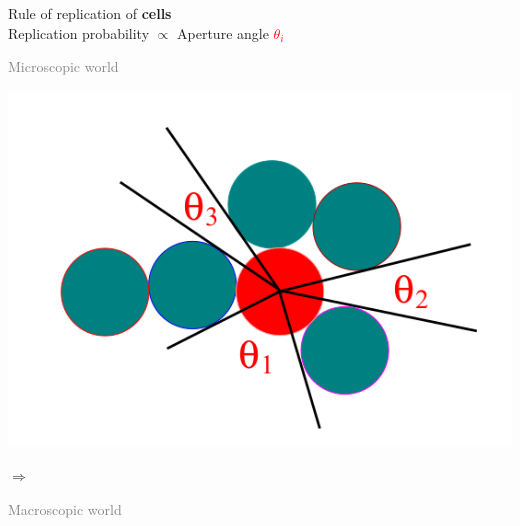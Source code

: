 \documentclass[9pt,table,xcolor=dvipsnames]{beamer}
\begin{document}
\begin{frame} %

  \begin{center}
    Rule of replication of \textcolor{cyan!50!black}{\bf cells}\\[1em]
    Replication probability $\propto$ Aperture angle \textcolor{red}{\bf $\theta_i$}
  \end{center}

  \bigskip
  \begin{center}
    \begin{minipage}{0.4\textwidth}
      \begin{center}
        \textcolor{gray}{\tiny Microscopic world}

        \includegraphics[scale=0.25]{figs/Eden-Mechanism.png}
        \bigskip

      \end{center}
    \end{minipage}
    \hfill
    {\Huge $\Rightarrow$}
    \hfill
    \begin{minipage}{0.4\textwidth}
      \begin{center}
        \textcolor{gray}{\tiny Macroscopic world}
        \medskip


\end{center}
\end{minipage}
\end{center}
\end{frame}
\end{document}
